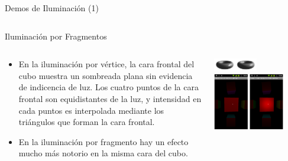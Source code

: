 \documentclass[aspectratio=169,compress]{beamer}
\begin{document}
\begin{frame}{Demos de Iluminación (1)}
\begin{columns}
\begin{column}{0.3\textwidth}
\begin{center}
\end{center}
\end{column}
\end{columns}
\end{frame}



\begin{frame}{Iluminación por Fragmentos}
\begin{columns}
\begin{column}{0.5\textwidth}
\begin{itemize}
\item En la iluminación por vértice, la cara frontal del cubo muestra un sombreada plana sin evidencia de indicencia de luz. Los cuatro puntos de la cara frontal son equidistantes de la luz, y intensidad en cada puntos es interpolada mediante los triángulos que forman la cara frontal.
\item En la iluminación por fragmento hay un efecto mucho más notorio en la misma cara del cubo.
\end{itemize}

\end{column}
\begin{column}{0.5\textwidth}
\begin{center}
\includegraphics[width=0.48\textwidth]{FigsOpenGL/specular3}\\
\includegraphics[width=0.78\textwidth]{FigsOpenGL/PerPixelVsPerFragmentShading}
 \end{center}
\end{column}
\end{columns}

\end{frame}
\end{document}
